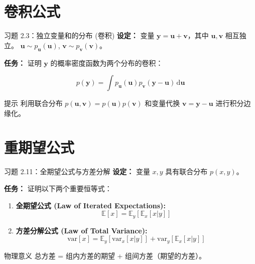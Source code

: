 \documentclass[12pt, aspectratio=169]{beamer}
\begin{document}
\section{卷积公式}
\begin{frame}{习题 2.3：独立变量和的分布 (卷积)}
    \textbf{设定：}
    变量 $\mathbf{y} = \mathbf{u} + \mathbf{v}$，其中 $\mathbf{u}, \mathbf{v}$ 相互独立。
    $\mathbf{u} \sim p_{\mathbf{u}}(\mathbf{u})$, $\mathbf{v} \sim p_{\mathbf{v}}(\mathbf{v})$。
    
    \textbf{任务：}
    证明 $\mathbf{y}$ 的概率密度函数为两个分布的卷积：
    
    \begin{equation}
        p(\mathbf{y}) = \int p_{\mathbf{u}}(\mathbf{u})p_{\mathbf{v}}(\mathbf{y} - \mathbf{u}) \,\mathrm{d}\mathbf{u}
    \end{equation}
    
    \begin{block}{提示}
        利用联合分布 $p(\mathbf{u}, \mathbf{v}) = p(\mathbf{u})p(\mathbf{v})$ 和变量代换 $\mathbf{v} = \mathbf{y} - \mathbf{u}$ 进行积分边缘化。
    \end{block}
\end{frame}

\section{重期望公式}
\begin{frame}{习题 2.11：全期望公式与方差分解}
    \textbf{设定：}
    变量 $x, y$ 具有联合分布 $p(x, y)$。
    
    \textbf{任务：}
    证明以下两个重要恒等式：
    \begin{enumerate}
        \item \textbf{全期望公式 (Law of Iterated Expectations):}
        \[ \mathbb{E}[x] = \mathbb{E}_y [\mathbb{E}_x[x|y]] \]
        
        \item \textbf{方差分解公式 (Law of Total Variance):}
        \[ \text{var}[x] = \mathbb{E}_y [\text{var}_x[x|y]] + \text{var}_y [\mathbb{E}_x[x|y]] \]
    \end{enumerate}
    
    \begin{alertblock}{物理意义}
        总方差 = 组内方差的期望 + 组间方差（期望的方差）。
    \end{alertblock}
\end{frame}
\end{document}
